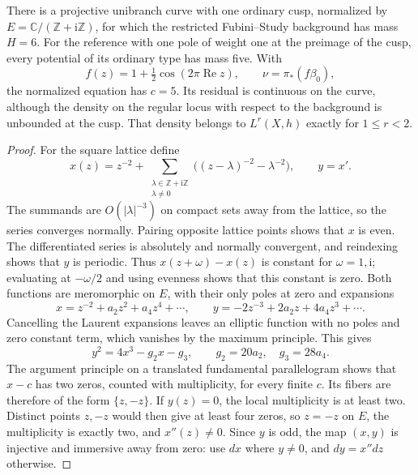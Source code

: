\begin{example}\label{ex:unibranch-elliptic-cusp}
There is a projective unibranch curve with one ordinary cusp, normalized by $E=\mathbb C/(\mathbb Z+\mathrm i\mathbb Z)$, for which the restricted Fubini--Study background has mass $H=6$. For the reference with one pole of weight one at the preimage of the cusp, every potential of its ordinary type has mass five. With
\[
 f(z)=1+\tfrac12\cos(2\pi\operatorname{Re}z),\qquad
 \nu=\pi_*(f\beta_0),
\]
the normalized equation has $c=5$. Its residual is continuous on the curve, although the density on the regular locus with respect to the background is unbounded at the cusp. That density belongs to $L^r(X,h)$ exactly for $1\leq r<2$.
\end{example}
\begin{proof}
For the square lattice define
\[
 x(z)=z^{-2}+\sum_{\substack{\lambda\in\mathbb Z+\mathrm i\mathbb Z\\\lambda\ne0}}
       \bigl((z-\lambda)^{-2}-\lambda^{-2}\bigr),
 \qquad y=x'.
\]
The summands are $O(|\lambda|^{-3})$ on compact sets away from the lattice, so the series converges normally. Pairing opposite lattice points shows that $x$ is even. The differentiated series is absolutely and normally convergent, and reindexing shows that $y$ is periodic. Thus $x(z+\omega)-x(z)$ is constant for $\omega=1,\mathrm i$; evaluating at $-\omega/2$ and using evenness shows that this constant is zero. Both functions are meromorphic on $E$, with their only poles at zero and expansions
\[
 x=z^{-2}+a_2z^2+a_4z^4+\cdots,
 \qquad y=-2z^{-3}+2a_2z+4a_4z^3+\cdots.
\]
Cancelling the Laurent expansions leaves an elliptic function with no poles and zero constant term, which vanishes by the maximum principle. This gives
\begin{equation}\label{eq:unibranch-elliptic-cubic}
 y^2=4x^3-g_2x-g_3,
 \qquad g_2=20a_2,\quad g_3=28a_4.
\end{equation}
The argument principle on a translated fundamental parallelogram shows that $x-c$ has two zeros, counted with multiplicity, for every finite $c$. Its fibers are therefore of the form $\{z,-z\}$. If $y(z)=0$, the local multiplicity is at least two. Distinct points $z,-z$ would then give at least four zeros, so $z=-z$ on $E$, the multiplicity is exactly two, and $x''(z)\ne0$. Since $y$ is odd, the map $(x,y)$ is injective and immersive away from zero: use $dx$ where $y\ne0$, and $dy=x''dz$ otherwise.


\end{proof}
